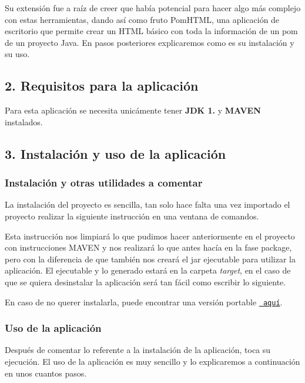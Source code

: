 Su extensión fue a raíz de creer que había potencial para hacer algo más complejo con estas herramientas, dando así como fruto Pom\+H\+T\+ML, una aplicación de escritorio que permite crear un H\+T\+ML básico con toda la información de un pom de un proyecto Java. En pasos posteriores explicaremos como es su instalación y su uso.

\subsection*{2. Requisitos para la aplicación}

Para esta aplicación se necesita unicámente tener {\bfseries{J\+DK 1.}} y {\bfseries{M\+A\+V\+EN}} instalados.

\subsection*{3. Instalación y uso de la aplicación}

\subsubsection*{Instalación y otras utilidades a comentar}

La instalación del proyecto es sencilla, tan solo hace falta una vez importado el proyecto realizar la siguiente instrucción en una ventana de comandos. 
\begin{DoxyCode}{0}
\end{DoxyCode}
 Esta instrucción nos limpiará lo que pudimos hacer anteriormente en el proyecto con instrucciones M\+A\+V\+EN y nos realizará lo que antes hacía en la fase package, pero con la diferencia de que también nos creará el jar ejecutable para utilizar la aplicación. El ejecutable y lo generado estará en la carpeta {\itshape target}, en el caso de que se quiera desinstalar la aplicación será tan fácil como escribir lo siguiente. 
\begin{DoxyCode}{0}
\end{DoxyCode}
 En caso de no querer instalarla, puede encontrar una versión portable \href{https://github.com/cs-ehu/GAICurricula/releases/tag/1.0.1}{\texttt{ aquí}}. \subsubsection*{Uso de la aplicación}

Después de comentar lo referente a la instalación de la aplicación, toca su ejecución. El uso de la aplicación es muy sencillo y lo explicaremos a continuación en unos cuantos pasos.


